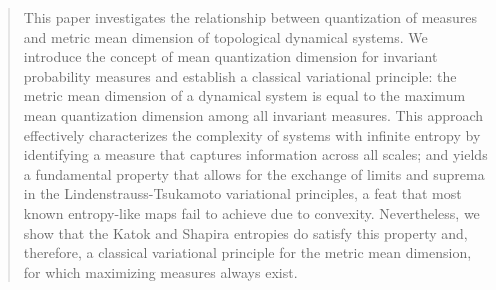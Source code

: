 \documentclass[11pt,a4paper,reqno]{amsart}
\theoremstyle{plain}
\theoremstyle{definition}
\newcommand{\ep} {\varepsilon}
\newcommand{\vep}{\varepsilon}
\newcommand{\cP}{{\mathcal P}}
\begin{document}
\begin{abstract}
This paper investigates the relationship between quantization of measures and metric mean dimension of topological dynamical systems. We introduce the concept of mean quantization dimension for invariant probability measures and establish a classical variational principle: the metric mean dimension of a dynamical system is equal to the maximum mean quantization dimension among all invariant measures. This approach effectively characterizes the complexity of systems with infinite entropy by identifying a measure that captures information across all scales; and yields a fundamental property that allows for the exchange of limits and suprema in the Lindenstrauss-Tsukamoto variational principles, a feat that most known entropy-like maps fail to achieve due to convexity. Nevertheless, we show that the Katok and Shapira entropies do satisfy this property and, therefore, a classical variational principle for the metric mean dimension, for which maximizing measures always exist.







\end{abstract}
\end{document}
